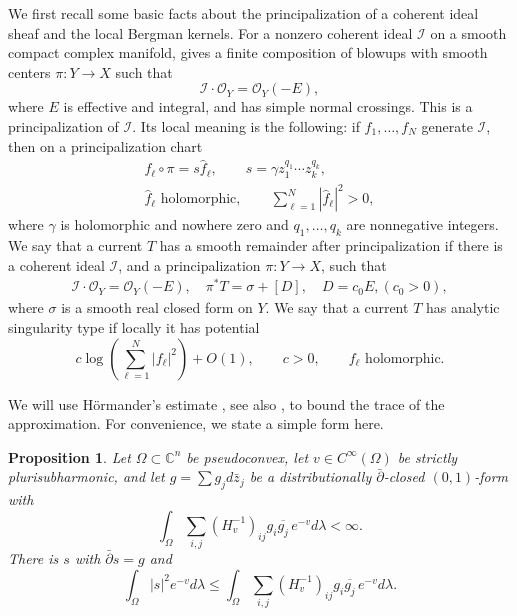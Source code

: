 \documentclass[reqno]{amsart}
\numberwithin{equation}{section}
\newtheorem{proposition}[theorem]{Proposition}
\theoremstyle{definition}
\newcommand{\cI}{\mathcal I}
\newcommand{\cO}{\mathcal O}
\begin{document}
We first recall some basic facts about the principalization of a coherent ideal sheaf and the local Bergman kernels. For a nonzero coherent
ideal $\mathcal I$ on a smooth compact complex manifold,
\cite[Theorem 1.10]{BM97} gives a finite composition of blowups
with smooth centers $\pi:Y\to X$ such that
\[
\mathcal I\cdot\mathcal O_Y=\mathcal O_Y(-E),
\]
where $E$ is effective and integral, and has simple normal crossings. This is a principalization of $\mathcal I$.
Its local meaning is the following: if $f_1,\ldots,f_N$
generate $\mathcal I$, then on a principalization chart
\[
\begin{gathered}
f_\ell\circ\pi=s\widehat f_\ell,\qquad
s=\gamma z_1^{q_1}\cdots z_k^{q_k},\\
\widehat f_\ell\text{ holomorphic},\qquad
\sum_{\ell=1}^N|\widehat f_\ell|^2>0,
\end{gathered}
\]
where $\gamma$ is holomorphic and nowhere zero and
$q_1,\ldots,q_k$ are nonnegative integers.
We say that a current $T$ has a smooth remainder after principalization if there is a coherent ideal $\cI$, and a principalization $\pi:Y\to X$, such that \begin{equation}
    \begin{aligned}
        \cI\cdot\cO_Y=\cO_Y(-E), \quad \pi^*T=\sigma+[D], \quad D=c_0E, (c_0>0),
    \end{aligned}
\end{equation}
where $\sigma $ is a smooth real closed form on $Y$. We say that a current $T$ has analytic singularity type if locally it has potential \[
c\log\left(\sum_{\ell=1}^N|f_{\ell}|^2\right)+O(1),\qquad c>0,\qquad f_\ell \text{ holomorphic}.
\]

We will use H\"ormander's estimate \cite{H65}, see also \cite[Chapter VIII, Theorem~6.1]{D12}, to bound the trace of the approximation. For convenience, we state a simple form here. 
\begin{proposition}\label{prop:hormander}
    Let $\Omega\subset\mathbb C^n$ be pseudoconvex, let $v\in C^\infty(\Omega)$ be strictly plurisubharmonic, and let $g=\sum g_jd\bar z_j$ be a distributionally $\bar\partial$-closed $(0,1)$-form with
\[
\int_\Omega \sum_{i,j}(H_v^{-1})_{ij}g_i\overline{g_j}\,e^{-v}d\lambda<\infty.
\]
There is $s$ with $\bar\partial s=g$ and
\begin{equation}\label{eq:hormander}
\int_\Omega |s|^2e^{-v}d\lambda
 \le\int_\Omega \sum_{i,j}(H_v^{-1})_{ij}g_i\overline{g_j}\,e^{-v}d\lambda.
\end{equation}
\end{proposition}
\end{document}

